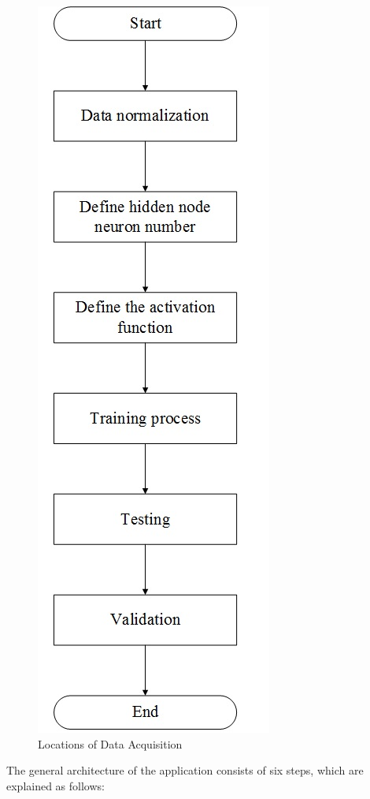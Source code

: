 \documentclass[journal,comsoc]{IEEEtran}
\let\MYoriglatexcaption\caption
\renewcommand{\caption}[2][\relax]{\MYoriglatexcaption[#2]{#2}}
\begin{document}
\begin{figure}[th]
\centering
\includegraphics[scale=0.2]{general_architecture.jpg}
\caption{Locations of Data Acquisition \cite{Rahmat16}}
\label{fig2}
\end{figure}

The general architecture of the application consists of six steps, which are explained as follows:
\end{document}
